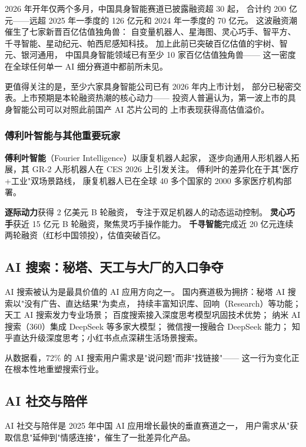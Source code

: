 2026 年开年仅两个多月，中国具身智能赛道已披露融资超 30 起，
合计约 200 亿元——远超 2025 年一季度的 126 亿元和 2024 年一季度的 70 亿元。
这波融资潮催生了七家新晋百亿估值独角兽：
自变量机器人、星海图、灵心巧手、智平方、千寻智能、星动纪元、帕西尼感知科技。
加上此前已突破百亿估值的宇树、智元、银河通用，
中国具身智能领域已有至少 10 家百亿估值独角兽——
这一密度在全球任何单一 AI 细分赛道中都前所未见。

更值得关注的是，至少六家具身智能公司已有 2026 年内上市计划，
部分已秘密交表。上市预期是本轮融资热潮的核心动力——
投资人普遍认为，第一波上市的具身智能公司可以对照此前国产 AI 芯片公司的
上市表现获得高估值溢价。

\subsubsection{傅利叶智能与其他重要玩家}

\textbf{傅利叶智能}（Fourier Intelligence）以康复机器人起家，
逐步向通用人形机器人拓展，其 GR-2 人形机器人在 CES 2026 上引发关注。
傅利叶的差异化在于其"医疗+工业"双场景路线，
康复机器人已在全球 40 多个国家的 2000 多家医疗机构部署。

\textbf{逐际动力}获得 2 亿美元 B 轮融资，
专注于双足机器人的动态运动控制。
\textbf{灵心巧手}获近 15 亿元 B 轮融资，聚焦灵巧手操作能力。
\textbf{千寻智能}完成近 20 亿元连续两轮融资（红杉中国领投），估值突破百亿。

\subsection{AI 搜索：秘塔、天工与大厂的入口争夺}
\label{subsec:china-ai-search}

AI 搜索被认为是最具价值的 AI 应用方向之一。
国内赛道极为拥挤：秘塔 AI 搜索以"没有广告、直达结果"为卖点，
持续丰富知识库、回响（Research）等功能；天工 AI 搜索发力专业场景；
百度搜索接入深度思考模型巩固技术优势；
纳米 AI 搜索（360）集成 DeepSeek 等多家大模型；
微信搜一搜融合 DeepSeek 能力；
知乎直达升级深度思考；小红书点点深耕生活场景搜索。

从数据看，72\% 的 AI 搜索用户需求是"说问题"而非"找链接"——
这一行为变化正在根本性地重塑搜索行业。

\subsection{AI 社交与陪伴}
\label{subsec:china-ai-social}

AI 社交与陪伴是 2025 年中国 AI 应用增长最快的垂直赛道之一，
用户需求从"获取信息"延伸到"情感连接"，催生了一批差异化产品。

